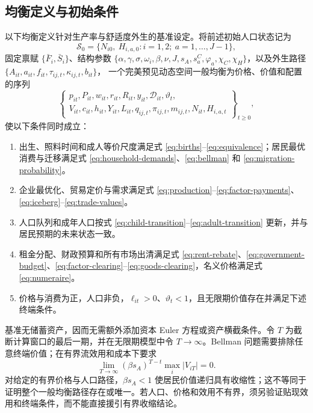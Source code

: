 \documentclass[UTF8,a4paper,zihao=-4,fontset=windows]{ctexart}
\numberwithin{equation}{section}
\begin{document}
\subsection{均衡定义与初始条件}
以下均衡定义针对生产率与舒适度外生的基准设定。将前述初始人口状态记为
\begin{equation}
  \mathcal S_0=\{N_{i0},\ H_{i,a,0}:i=1,2;\ a=1,\ldots,J-1\},
\end{equation}
固定禀赋 $\{\bar F_i,\bar S_i\}$、结构参数
$\{\alpha,\gamma,\sigma,\omega_i,\beta,\nu,J,s_A,s^C_a,
\varphi_a,\chi_C,\chi_H\}$，以及外生路径
$\{A_{it},a_{it},f_{it},\tau_{ij,t},\kappa_{ij,t},b_{it}\}$，
一个完美预见动态空间一般均衡为价格、价值和配置的序列
\begin{equation}
  \left\{\begin{gathered}
  p_{it},P_{it},w_{it},r_{it},R_{it},y_{it},\mathcal D_{it},\vartheta_t,\\
  V_{it},c_{it},h_{it},Y_{it},L_{it},
  q_{ij,t},\pi_{ij,t},m_{ij,t},N_{it},H_{i,a,t}
  \end{gathered}\right\}_{t\geq0},
\end{equation}
使以下条件同时成立：
\begin{enumerate}
  \item 出生、照料时间和成人等价尺度满足式 \eqref{eq:births}--\eqref{eq:equivalence}；居民最优消费与迁移满足式 \eqref{eq:household-demands}、\eqref{eq:bellman} 和 \eqref{eq:migration-probability}。
  \item 企业最优化、贸易定价与需求满足式 \eqref{eq:production}--\eqref{eq:factor-payments}、\eqref{eq:iceberg}--\eqref{eq:trade-values}。
  \item 人口队列和成年人口按式 \eqref{eq:child-transition}--\eqref{eq:adult-transition} 更新，并与居民预期的未来状态一致。
  \item 租金分配、财政预算和所有市场出清满足式 \eqref{eq:rent-rebate}、\eqref{eq:government-budget}、\eqref{eq:factor-clearing}--\eqref{eq:goods-clearing}，名义价格满足式 \eqref{eq:numeraire}。
  \item 价格与消费为正，人口非负，$\ell_{it}>0$、$\vartheta_t<1$，且无限期价值存在并满足下述终端条件。
\end{enumerate}
基准无储蓄资产，因而无需额外添加资本 Euler 方程或资产横截条件。令 $T$ 为截断计算窗口的最后一期，并在无限期模型中令 $T\to\infty$。Bellman 问题需要排除任意终端价值；在有界流效用和成本下要求
\begin{equation}
  \lim_{T\to\infty}(\beta s_A)^{T-t}
        \max_i|V_{iT}|=0.
  \label{eq:value-terminal}
\end{equation}
对给定的有界价格与人口路径，$\beta s_A<1$ 使居民价值递归具有收缩性；这不等同于证明整个一般均衡路径存在或唯一。若人口、价格和效用不有界，须另验证贴现效用和终端条件，而不能直接援引有界收缩结论。
\end{document}
